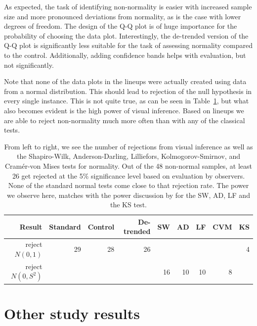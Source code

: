 \documentclass{article}\usepackage[]{graphicx}\usepackage[]{color}
\begin{document}
%
As expected, the task of identifying non-normality is easier with increased sample size and more pronounced deviations from normality, as is the case with lower degrees of freedom. The  design of the Q-Q plot is of huge importance for the probability of choosing the data plot. Interestingly, the de-trended version of the Q-Q plot is significantly less suitable for the task of assessing normality compared to the control. Additionally, adding confidence bands helps with evaluation, but not significantly. 

Note that none of the data plots in the lineups were actually created using data from a normal distribution. This should lead to rejection of the null hypothesis in every single instance. This is not quite true, as can be seen in Table~\ref{tab:reject}, but what also becomes evident is the high power  of visual inference. Based on lineups we are able to reject non-normality much more often than with any of the classical tests.

\begin{table}[ht]
\centering
\caption{\label{tab:reject} 
 From left to right, we see the number of rejections from visual inference as well as the  Shapiro-Wilk, Anderson-Darling, Lilliefors,  Kolmogorov-Smirnov, and Cram\'er-von Mises tests for normality. Out of the 48 non-normal samples, at least 26 get rejected at the 5\% significance level based on evaluation by observers. None of the standard normal tests come close to that rejection rate. The power we observe here, matches with the power discussion by \citet{razali:2011} for the SW, AD, LF and the KS test.}
\begin{tabular}{rrrrrrrrr}
  \hline
Result & Standard & Control & De-trended & SW & AD & LF   & CVM & KS\\ 
  \hline
  \hline
  reject $N(0,1)$ & 29 & 28 & 26  &   &  &   &  & 4\\ 
   \hline
  reject $N(0,S^2)$ &  &  &   &  16 & 10 &  10 & 8 & \\ 
\end{tabular}
\end{table}



\section{Other study results}
\end{document}
